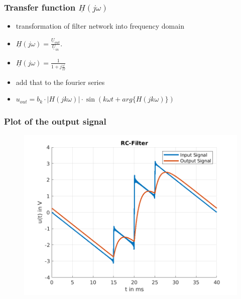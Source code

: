 \documentclass{beamer}
\begin{document}
\begin{frame}
  \frametitle{Transfer function $\underline{H}(j\omega)$}
  \begin{itemize}
    \item transformation of filter network into frequency domain
    \item $\underline{H}(j\omega) = \frac{\underline{U}_{out}}{\underline{U}_{in}}.$
    \item $\underline{H}(j\omega) = \frac{1}{1 + j\frac{\omega}{\Omega}}$
    \item add that to the fourier series
    \item $u_{out} = b_k \cdot |H(jk\omega)| \cdot \sin(k\omega t + arg\{H(jk\omega)\})$
  \end{itemize}
\end{frame}
\begin{frame}
  \frametitle{Plot of the output signal}
  \begin{figure}
    \includegraphics[scale=0.5]{../latex/Figures/output_signal.png}
  \end{figure}
\end{frame}
\end{document}
